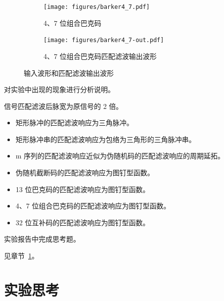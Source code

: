 \documentclass[../main]{subfiles}
\begin{document}
\begin{figure}[htbp]
  \begin{subfigure}[htbp]{0.23\linewidth}
    \centering
    \texttt{[image: figures/barker4\_7.pdf]}
    \caption{4、7 位组合巴克码}%
    \label{fig:barker4_7_}
  \end{subfigure}
  \quad
  \begin{subfigure}[htbp]{0.23\linewidth}
    \centering
    \texttt{[image: figures/barker4\_7-out.pdf]}
    \caption{4、7 位组合巴克码匹配滤波输出波形}%
    \label{fig:barker4_7-out_}
  \end{subfigure}
  \caption{输入波形和匹配滤波输出波形}%
  \label{fig:mf_}
\end{figure}


\begin{Exercise}
  对实验中出现的现象进行分析说明。
\end{Exercise}

\begin{Answer}
  信号匹配滤波后脉宽为原信号的 2 倍。

  \begin{itemize}
    \item 矩形脉冲的匹配滤波响应为三角脉冲。
    \item 矩形脉冲串的匹配滤波响应为包络为三角形的三角脉冲串。
    \item m 序列的匹配滤波响应近似为伪随机码的匹配滤波响应的周期延拓。
    \item 伪随机截断码的匹配滤波响应为图钉型函数。
    \item 13 位巴克码的匹配滤波响应为图钉型函数。
    \item 4、7 位组合巴克码的匹配滤波响应为图钉型函数。
    \item 32 位互补码的匹配滤波响应为图钉型函数。
  \end{itemize}
\end{Answer}

\begin{Exercise}
  实验报告中完成思考题。
\end{Exercise}

\begin{Answer}
  见章节~\ref{sec:\arabic{chapter}thought}。
\end{Answer}

\section{实验思考}%
\label{sec:\arabic{chapter}thought}
\end{document}
